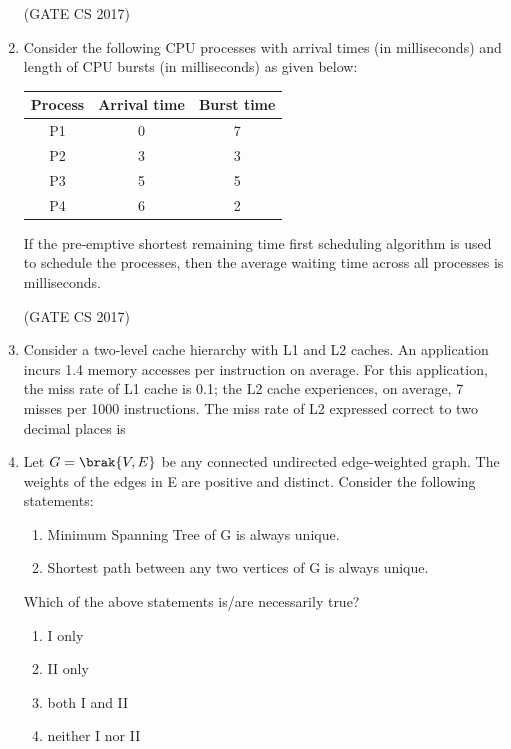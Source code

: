 \documentclass[a4paper, 11pt]{article}
\begin{document}
\begin{enumerate}
    \hfill (GATE CS 2017)
    
    \item Consider the following CPU processes with arrival times (in milliseconds) and length of CPU bursts (in milliseconds) as given below:
    \begin{center}
    \begin{tabular}{|c|c|c|}
        \hline
        Process & Arrival time & Burst time \\
        \hline
        P1 & 0 & 7 \\
        P2 & 3 & 3 \\
        P3 & 5 & 5 \\
        P4 & 6 & 2 \\
        \hline
    \end{tabular}
    \end{center}
    
    If the pre-emptive shortest remaining time first scheduling algorithm is used to schedule the processes, then the average waiting time across all processes is \underline{\hspace{2cm}} milliseconds.
    
    \hfill (GATE CS 2017)
    
     \item Consider a two-level cache hierarchy with L1 and L2 caches. An application incurs 1.4 memory accesses per instruction on average. For this application, the miss rate of L1 cache is 0.1; the L2 cache experiences, on average, 7 misses per 1000 instructions. The miss rate of L2 expressed correct to two decimal places is \underline{\hspace{2cm}}
    
    \hfill{}
    
    \item Let $G=\brak{V,E}$ be any connected undirected edge-weighted graph. The weights of the edges in E are positive and distinct. Consider the following statements:
    \begin{enumerate}[label=\Roman*]
        \item Minimum Spanning Tree of G is always unique.
        \item Shortest path between any two vertices of G is always unique.
    \end{enumerate}
    
    
    Which of the above statements is/are necessarily true?
    \begin{enumerate}
        \item I only
        \item II only
        \item both I and II
        \item neither I nor II
    \end{enumerate}


\end{enumerate}
\end{document}
